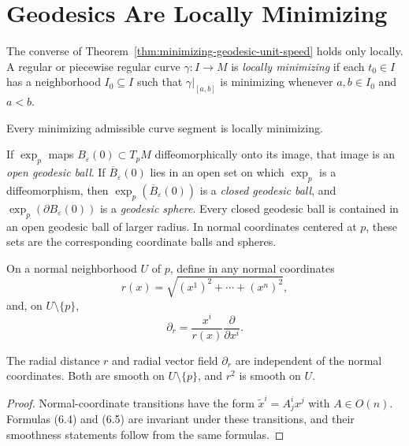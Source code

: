 \section{Geodesics Are Locally Minimizing}

The converse of Theorem~\ref{thm:minimizing-geodesic-unit-speed} holds only
locally.  A regular or piecewise regular curve $\gamma:I\to M$ is
\emph{locally minimizing} if each $t_0\in I$ has a neighborhood $I_0\subseteq
I$ such that $\gamma|_{[a,b]}$ is minimizing whenever $a,b\in I_0$ and
$a<b$.

\begin{lemma}
\label{lem:minimizing-curves-locally-minimizing}

Every minimizing admissible curve segment is locally minimizing.
\end{lemma}

If $\exp_p$ maps $B_\varepsilon(0)\subset T_pM$ diffeomorphically onto its
image, that image is an \emph{open geodesic ball}.  If
$\overline B_\varepsilon(0)$ lies in an open set on which $\exp_p$ is a
diffeomorphism, then $\exp_p(\overline B_\varepsilon(0))$ is a
\emph{closed geodesic ball}, and $\exp_p(\partial B_\varepsilon(0))$ is a
\emph{geodesic sphere}.  Every closed geodesic ball is contained in an open
geodesic ball of larger radius.  In normal coordinates centered at $p$, these
sets are the corresponding coordinate balls and spheres.

On a normal neighborhood $U$ of $p$, define in any normal coordinates
\begin{equation}
r(x) = \sqrt{(x^1)^2 + \cdots + (x^n)^2}, \tag{6.4}
\end{equation}
and, on $U\setminus\{p\}$,
\begin{equation}
\partial_r = \frac{x^i}{r(x)} \frac{\partial}{\partial x^i}. \tag{6.5}
\end{equation}

\begin{lemma}
\label{lem:radial-distance-well-defined}


The radial distance $r$ and radial vector field $\partial_r$ are independent
of the normal coordinates.  Both are smooth on $U\setminus\{p\}$, and $r^2$
is smooth on $U$.
\end{lemma}

\begin{proof}
\sketch
Normal-coordinate transitions have the form
$\widetilde x^i=A^i_jx^j$ with $A\in O(n)$.  Formulas (6.4) and (6.5) are
invariant under these transitions, and their smoothness statements follow
from the same formulas.
\end{proof}

